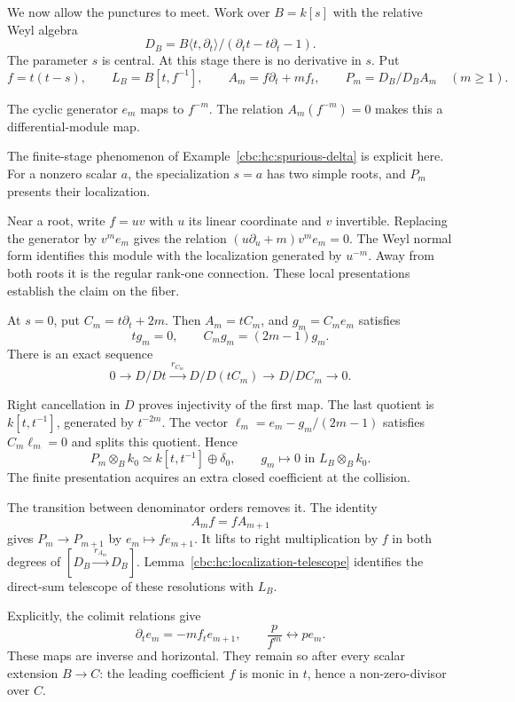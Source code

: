 We now allow the punctures to meet. Work over $B=k[s]$
with the relative Weyl algebra
\[
 D_B=B\langle t,\partial_t\rangle/
                         (\partial_t t-t\partial_t-1).
\]
The parameter $s$ is central. At this stage there is
no derivative in $s$. Put
\[
 f=t(t-s),\qquad L_B=B[t,f^{-1}],\qquad
 A_m=f\partial_t+m f_t,\qquad
 P_m=D_B/D_BA_m\quad(m\geq1).
\]

The cyclic generator $e_m$ maps to $f^{-m}$.
The relation $A_m(f^{-m})=0$ makes this a
differential-module map.

The finite-stage phenomenon of
Example~\ref{cbc:hc:spurious-delta} is explicit here.
For a nonzero scalar $a$, the specialization $s=a$
has two simple roots, and $P_m$ presents their
localization.

Near a root, write $f=uv$ with $u$
its linear coordinate and $v$ invertible. Replacing
the generator by $v^m e_m$ gives the relation
$(u\partial_u+m)v^m e_m=0$. The Weyl normal
form identifies this module with the localization
generated by $u^{-m}$. Away from both roots it
is the regular rank-one connection. These local
presentations establish the claim on the fiber.

At $s=0$, put $C_m=t\partial_t+2m$.
Then $A_m=tC_m$, and $g_m=C_me_m$ satisfies
\[
 tg_m=0,\qquad C_mg_m=(2m-1)g_m.
\]
There is an exact sequence
\[
 0\longrightarrow D/Dt
   \xrightarrow{\,r_{C_m}\,}D/D(tC_m)
   \longrightarrow D/DC_m\longrightarrow0.
\]

Right cancellation in $D$ proves injectivity of the
first map. The last quotient is $k[t,t^{-1}]$,
generated by $t^{-2m}$. The vector
$\ell_m=e_m-g_m/(2m-1)$ satisfies $C_m\ell_m=0$
and splits this quotient. Hence
\begin{equation}\label{cbc:ac:extra-delta}
 P_m\otimes_B k_0\simeq k[t,t^{-1}]\oplus\delta_0,
 \qquad g_m\longmapsto0\text{ in }L_B\otimes_B k_0.
\end{equation}
The finite presentation acquires an extra closed
coefficient at the collision.

The transition between denominator orders removes it.
The identity
\[
 A_mf=fA_{m+1}
\]
gives $P_m\to P_{m+1}$ by $e_m\mapsto f e_{m+1}$.
It lifts to right multiplication by $f$ in both
degrees of $[D_B\xrightarrow{r_{A_m}}D_B]$.
Lemma~\ref{cbc:hc:localization-telescope} identifies
the direct-sum telescope of these resolutions with
$L_B$.

Explicitly, the colimit relations give
\[
 \partial_t e_m=-m f_t e_{m+1},\qquad
 \frac p{f^m}\longleftrightarrow p e_m.
\]
These maps are inverse and horizontal.
They remain so after every scalar extension $B\to C$:
the leading coefficient $f$ is monic in $t$, hence
a non-zero-divisor over $C$.

